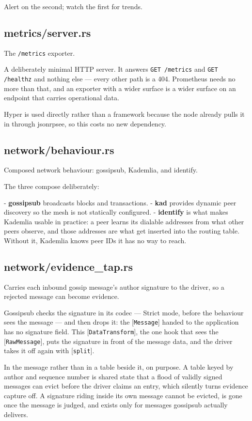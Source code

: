 \documentclass[11pt,a4paper]{article}
\begin{document}
Alert on the second; watch the first for trends.

\subsection{metrics/server.rs}
The \texttt{/metrics} exporter.

A deliberately minimal HTTP server. It answers \texttt{GET /metrics} and
\texttt{GET /healthz} and nothing else — every other path is a 404. Prometheus
needs no more than that, and an exporter with a wider surface is a wider
surface on an endpoint that carries operational data.

Hyper is used directly rather than a framework because the node already
pulls it in through jsonrpsee, so this costs no new dependency.

\subsection{network/behaviour.rs}
Composed network behaviour: gossipsub, Kademlia, and identify.

The three compose deliberately:

- \textbf{gossipsub} broadcasts blocks and transactions.
- \textbf{kad} provides dynamic peer discovery so the mesh is not statically
  configured.
- \textbf{identify} is what makes Kademlia usable in practice: a peer learns its
  dialable addresses from what other peers observe, and those addresses are
  what get inserted into the routing table. Without it, Kademlia knows peer
  IDs it has no way to reach.

\subsection{network/evidence\_tap.rs}
Carries each inbound gossip message's author signature to the driver, so a
rejected message can become evidence.

Gossipsub checks the signature in its codec — Strict mode, before the
behaviour sees the message — and then drops it: the [\texttt{Message}] handed to
the application has no signature field. This [\texttt{DataTransform}], the one hook
that sees the [\texttt{RawMessage}], puts the signature in front of the message
data, and the driver takes it off again with [\texttt{split}].

In the message rather than in a table beside it, on purpose. A table keyed
by author and sequence number is shared state that a flood of validly signed
messages can evict before the driver claims an entry, which silently turns
evidence capture off. A signature riding inside its own message cannot be
evicted, is gone once the message is judged, and exists only for messages
gossipsub actually delivers.
\end{document}
